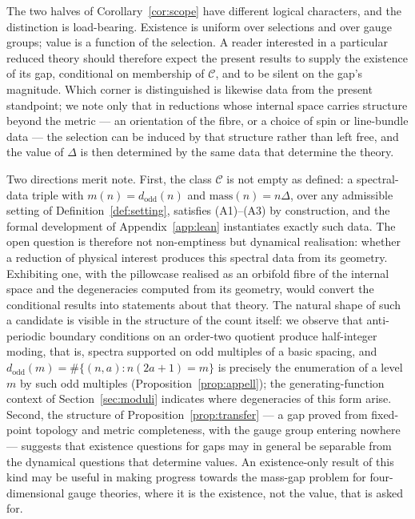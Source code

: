 \documentclass[11pt,a4paper]{article}
\newcommand{\dodd}{d_{\mathrm{odd}}}
\newcommand{\class}{\mathcal{C}}
\theoremstyle{plain}
\theoremstyle{definition}
\theoremstyle{remark}
\begin{document}
The two halves of Corollary~\ref{cor:scope} have different logical
characters, and the distinction is load-bearing. Existence is
uniform over selections and over gauge groups; value is a function of
the selection. A reader interested in a particular reduced theory
should therefore expect the present results to supply the existence
of its gap, conditional on membership of $\class$, and to be silent
on the gap's magnitude. Which corner is distinguished is likewise
data from the present standpoint; we note only that in reductions
whose internal space carries structure beyond the metric --- an
orientation of the fibre, or a choice of spin or line-bundle data ---
the selection can be induced by that structure rather than left free,
and the value of $\Delta$ is then determined by the same data that
determine the theory.

Two directions merit note. First, the class $\class$ is not empty
as defined: a spectral-data triple with $m(n) = \dodd(n)$ and
$\mathrm{mass}(n) = n\Delta$, over any admissible setting of
Definition~\ref{def:setting}, satisfies (A1)--(A3) by construction,
and the formal development of Appendix~\ref{app:lean} instantiates
exactly such data. The open question is therefore not non-emptiness
but dynamical realisation: whether a reduction of physical interest
produces this spectral data from its geometry. Exhibiting one, with
the pillowcase realised as an orbifold fibre of the internal space
and the degeneracies computed from its geometry, would convert the
conditional results into statements about that theory. The natural
shape of such a candidate is visible in the structure of the count
itself: we observe that anti-periodic boundary conditions on an
order-two quotient produce half-integer moding, that is, spectra
supported on odd multiples of a basic spacing, and
$\dodd(m) = \#\{(n,a) : n(2a+1) = m\}$ is precisely the enumeration
of a level $m$ by such odd multiples
(Proposition~\ref{prop:appell}); the generating-function context of
Section~\ref{sec:moduli} indicates where degeneracies of this form
arise. Second, the structure of
Proposition~\ref{prop:transfer} --- a gap proved from fixed-point
topology and metric completeness, with the gauge group entering
nowhere --- suggests that existence questions for gaps may in general
be separable from the dynamical questions that determine values. An
existence-only result of this kind may be useful in making progress
towards the mass-gap problem for four-dimensional gauge theories,
where it is the existence, not the value, that is asked for.
\end{document}

